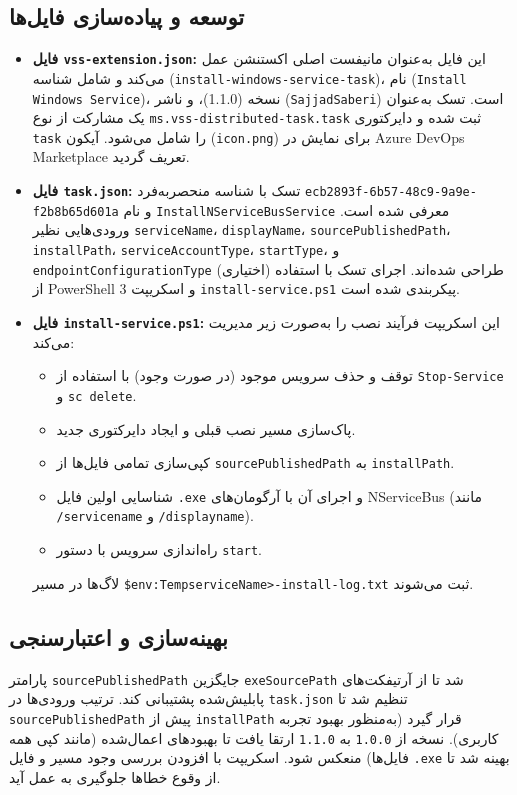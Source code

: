\documentclass[a4paper,12pt]{article}
\begin{document}
\subsection*{توسعه و پیاده‌سازی فایل‌ها}
\begin{itemize}
    \item \textbf{فایل \texttt{vss-extension.json}:}
    این فایل به‌عنوان مانیفست اصلی اکستنشن عمل می‌کند و شامل شناسه (\texttt{install-windows-service-task})، نام (\texttt{Install Windows Service})، نسخه (1.1.0)، و ناشر (\texttt{SajjadSaberi}) است. تسک به‌عنوان یک مشارکت از نوع \texttt{ms.vss-distributed-task.task} ثبت شده و دایرکتوری \texttt{task} را شامل می‌شود. آیکون (\texttt{icon.png}) برای نمایش در Azure DevOps Marketplace تعریف گردید.

    \item \textbf{فایل \texttt{task.json}:}
    تسک با شناسه منحصربه‌فرد \texttt{ecb2893f-6b57-48c9-9a9e-f2b8b65d601a} و نام \texttt{InstallNServiceBusService} معرفی شده است. ورودی‌هایی نظیر \texttt{serviceName}، \texttt{displayName}، \texttt{sourcePublishedPath}، \texttt{installPath}، \texttt{serviceAccountType}، \texttt{startType}، و \texttt{endpointConfigurationType} (اختیاری) طراحی شده‌اند. اجرای تسک با استفاده از PowerShell 3 و اسکریپت \texttt{install-service.ps1} پیکربندی شده است.

    \item \textbf{فایل \texttt{install-service.ps1}:}
    این اسکریپت فرآیند نصب را به‌صورت زیر مدیریت می‌کند:
    \begin{itemize}
        \item توقف و حذف سرویس موجود (در صورت وجود) با استفاده از \texttt{Stop-Service} و \texttt{sc delete}.
        \item پاک‌سازی مسیر نصب قبلی و ایجاد دایرکتوری جدید.
        \item کپی‌سازی تمامی فایل‌ها از \texttt{sourcePublishedPath} به \texttt{installPath}.
        \item شناسایی اولین فایل \texttt{.exe} و اجرای آن با آرگومان‌های NServiceBus (مانند \texttt{/servicename} و \texttt{/displayname}).
        \item راه‌اندازی سرویس با دستور \texttt{start}.
    \end{itemize}
    لاگ‌ها در مسیر \texttt{\$env:Temp\<serviceName>-install-log.txt} ثبت می‌شوند.
\end{itemize}

\subsection*{بهینه‌سازی و اعتبارسنجی}
پارامتر \texttt{sourcePublishedPath} جایگزین \texttt{exeSourcePath} شد تا از آرتیفکت‌های پابلیش‌شده پشتیبانی کند. ترتیب ورودی‌ها در \texttt{task.json} تنظیم شد تا \texttt{sourcePublishedPath} پیش از \texttt{installPath} قرار گیرد (به‌منظور بهبود تجربه کاربری). نسخه از \texttt{1.0.0} به \texttt{1.1.0} ارتقا یافت تا بهبودهای اعمال‌شده (مانند کپی همه فایل‌ها) منعکس شود. اسکریپت با افزودن بررسی وجود مسیر و فایل \texttt{.exe} بهینه شد تا از وقوع خطاها جلوگیری به عمل آید.
\end{document}
